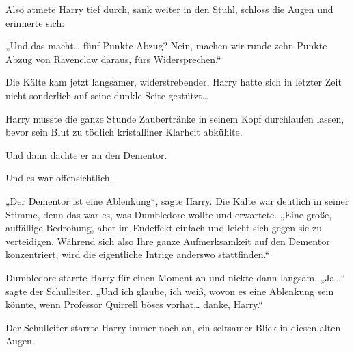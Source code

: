 Also atmete Harry tief durch, sank weiter in den Stuhl, schloss die Augen und erinnerte sich:

„Und das macht… fünf Punkte Abzug? Nein, machen wir runde zehn Punkte Abzug von Ravenclaw daraus, fürs Widersprechen.“

Die Kälte kam jetzt langsamer, widerstrebender, Harry hatte sich in letzter Zeit nicht sonderlich auf seine dunkle Seite gestützt…

Harry musste die ganze Stunde Zaubertränke in seinem Kopf durchlaufen lassen, bevor sein Blut zu tödlich kristalliner Klarheit abkühlte.

Und dann dachte er an den Dementor.

Und es war offensichtlich.

„Der Dementor ist eine Ablenkung“, sagte Harry. Die Kälte war deutlich in seiner Stimme, denn das war es, was Dumbledore wollte und erwartete. „Eine große, auffällige Bedrohung, aber im Endeffekt einfach und leicht sich gegen sie zu verteidigen. Während sich also Ihre ganze Aufmerksamkeit auf den Dementor konzentriert, wird die eigentliche Intrige anderswo stattfinden.“

Dumbledore starrte Harry für einen Moment an und nickte dann langsam. „Ja…“ sagte der Schulleiter. „Und ich glaube, ich weiß, wovon es eine Ablenkung sein könnte, wenn Professor Quirrell böses vorhat… danke, Harry.“

Der Schulleiter starrte Harry immer noch an, ein seltsamer Blick in diesen alten Augen.

